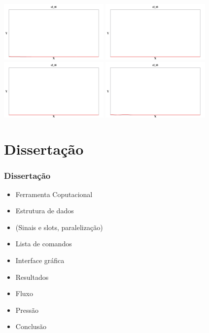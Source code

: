 \documentclass[10pt]{beamer}
\theoremstyle{remark}
\theoremstyle{definition}
\begin{document}
\begin{frame}[allowframebreaks]
	\begin{center}
		\includegraphics[width=0.4\textwidth]{images/flow_3_65.png}
		\includegraphics[width=0.4\textwidth]{images/flow_7_30.png}
		\includegraphics[width=0.4\textwidth]{images/flow_10_95.png}
		\includegraphics[width=0.4\textwidth]{images/flow_14_60.png}
	\end{center}
\end{frame}

\section{Dissertação}
\begin{frame}[allowframebreaks]
\frametitle{Dissertação}

\begin{itemize}
	\item Ferramenta Coputacional
	\item Estrutura de dados
	\item  (Sinais e slots, paralelização)
	\item Lista de comandos
	\item Interface gráfica
	\item Resultados
	\item Fluxo
	\item Pressão
	\item Conclusão
\end{itemize}

\end{frame}
\end{document}
